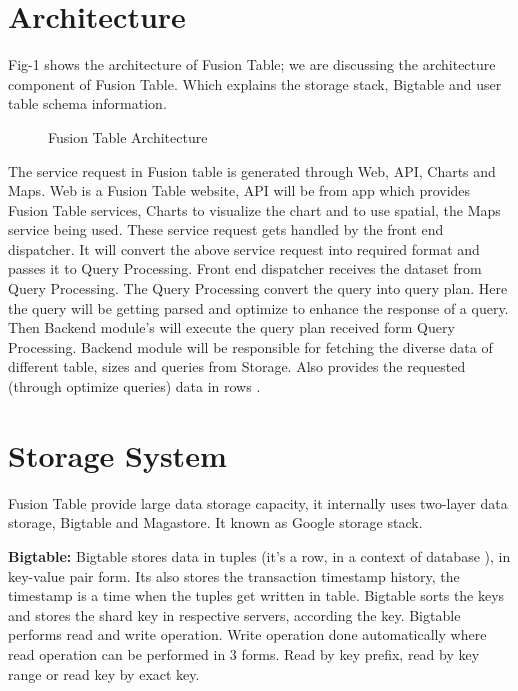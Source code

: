 \documentclass[9pt,twocolumn,twoside]{../../styles/osajnl}
\begin{document}
\section{Architecture}

Fig-1 shows the architecture of Fusion Table; we are discussing the architecture component of Fusion Table. Which explains the storage stack, Bigtable and user table schema information. 
 

\begin{figure}[htbp]
	\centering
	\caption{Fusion Table Architecture }
	\label{fig:false-color}
\end{figure}

The service request in Fusion table is generated through Web, API, Charts and Maps. Web is a Fusion Table website, API will be from app which provides Fusion Table services, Charts to visualize the chart and to use spatial, the Maps service being used. These service request gets handled by the front end dispatcher. It will convert the above service request into required format and passes it to Query Processing. Front end dispatcher receives the dataset from Query Processing. The Query Processing convert the query into query plan. Here the query will be getting parsed and optimize to enhance the response of a query. Then Backend module’s will execute the query plan received form Query Processing. Backend module will be responsible for fetching the diverse data of different table, sizes and queries from Storage. Also provides the requested (through optimize queries) data in rows \cite{www-6}.



\section{Storage System}

Fusion Table provide large data storage capacity, it internally uses two-layer data storage, Bigtable and Magastore. It known as Google storage stack.

\textbf{Bigtable:} Bigtable stores data in tuples (it’s a row, in a context of database ), in key-value pair form. Its also stores the transaction timestamp history, the timestamp is a time when the tuples get written in table. Bigtable sorts the keys and stores the shard key in respective servers, according the key. Bigtable performs read and write operation. Write operation done automatically where read operation can be performed in 3 forms. Read by key prefix, read by key range or read key by exact key. 
\end{document}
